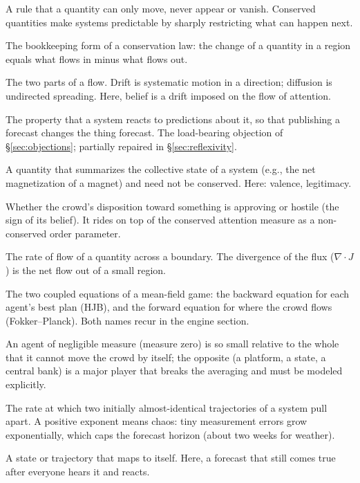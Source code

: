 \documentclass[11pt]{article}
\begin{document}
\begin{description}[itemsep=2pt,leftmargin=1.6em]
\item[Conservation law] A rule that a quantity can only move, never appear or vanish. Conserved quantities make systems predictable by sharply restricting what can happen next.
\item[Continuity equation] The bookkeeping form of a conservation law: the change of a quantity in a region equals what flows in minus what flows out.
\item[Drift / diffusion] The two parts of a flow. Drift is systematic motion in a direction; diffusion is undirected spreading. Here, belief is a drift imposed on the flow of attention.
\item[Reflexivity] The property that a system reacts to predictions about it, so that publishing a forecast changes the thing forecast. The load-bearing objection of \S\ref{sec:objections}; partially repaired in \S\ref{sec:reflexivity}.
\item[Order parameter] A quantity that summarizes the collective state of a system (e.g., the net magnetization of a magnet) and need not be conserved. Here: valence, legitimacy.
\item[Valence] Whether the crowd's disposition toward something is approving or hostile (the sign of its belief). It rides on top of the conserved attention measure as a non-conserved order parameter.
\item[Flux] The rate of flow of a quantity across a boundary. The divergence of the flux ($\nabla\cdot J$) is the net flow out of a small region.
\item[Hamilton--Jacobi--Bellman / Fokker--Planck] The two coupled equations of a mean-field game: the backward equation for each agent's best plan (HJB), and the forward equation for where the crowd flows (Fokker--Planck). Both names recur in the engine section.
\item[Major player / measure zero] An agent of negligible measure (measure zero) is so small relative to the whole that it cannot move the crowd by itself; the opposite (a platform, a state, a central bank) is a major player that breaks the averaging and must be modeled explicitly.
\item[Lyapunov exponent] The rate at which two initially almost-identical trajectories of a system pull apart. A positive exponent means chaos: tiny measurement errors grow exponentially, which caps the forecast horizon (about two weeks for weather).
\item[Fixed point] A state or trajectory that maps to itself. Here, a forecast that still comes true after everyone hears it and reacts.

\end{description}
\end{document}
